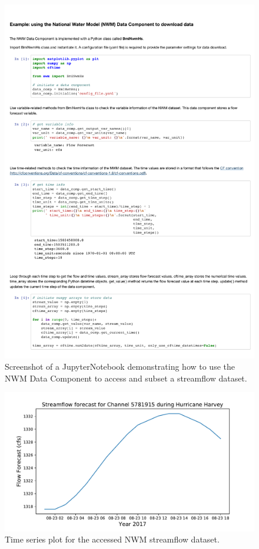 \documentclass[journal abbreviation, manuscript]{copernicus}
\begin{document}
\begin{figure}[h!]
\centering
\includegraphics[scale=0.57]{Figures/fig08.pdf}
\caption{Screenshot of a JupyterNotebook demonstrating how to use the NWM Data Component to access and subset a streamflow dataset. }
\label{fig:data_component1}
\end{figure}

\begin{figure}[h!]
\centering
\includegraphics[scale=0.5]{Figures/fig09.pdf}
\caption{Time series plot for the accessed NWM streamflow dataset.}
\label{fig:data_component2}
\end{figure}
\end{document}
